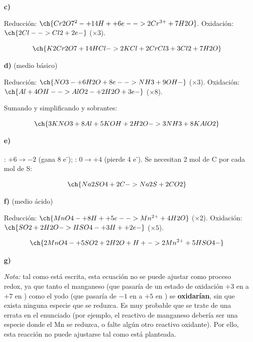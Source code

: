 \begin{exercise}
\begin{solu}
        \textbf{c) }

        Reducción: \(\ch{Cr2O7^2- + 14 H+ + 6 e- -> 2 Cr^{3+} + 7 H2O}\). Oxidación: \(\ch{2 Cl- -> Cl2 + 2 e-}\) (\(\times 3\)).

        \begin{equation*}
            \ch{K2Cr2O7 + 14 HCl -> 2 KCl + 2 CrCl3 + 3 Cl2 + 7 H2O}
        \end{equation*}

        \textbf{d) } (medio básico)

        Reducción: \(\ch{NO3- + 6 H2O + 8 e- -> NH3 + 9 OH-}\) (\(\times 3\)). Oxidación: \(\ch{Al + 4 OH- -> AlO2- + 2 H2O + 3 e-}\) (\(\times 8\)).

        Sumando y simplificando  y  sobrantes:

        \begin{equation*}
            \ch{3 KNO3 + 8 Al + 5 KOH + 2 H2O -> 3 NH3 + 8 KAlO2}
        \end{equation*}

        \textbf{e) }

        : \(+6 \to -2\) (gana 8 e\textsuperscript{-}); : \(0 \to +4\) (pierde 4 e\textsuperscript{-}). Se necesitan 2 mol de C por cada mol de S:

        \begin{equation*}
            \ch{Na2SO4 + 2 C -> Na2S + 2 CO2}
        \end{equation*}

        \textbf{f) } (medio ácido)

        Reducción: \(\ch{MnO4- + 8 H+ + 5 e- -> Mn^{2+} + 4 H2O}\) (\(\times 2\)). Oxidación: \(\ch{SO2 + 2 H2O -> HSO4- + 3 H+ + 2 e-}\) (\(\times 5\)).

        \begin{equation*}
            \ch{2 MnO4- + 5 SO2 + 2 H2O + H+ -> 2 Mn^{2+} + 5 HSO4-}
        \end{equation*}

        \textbf{g) }

        \textit{Nota:} tal como está escrita, esta ecuación no se puede ajustar como proceso redox, ya que tanto el manganeso (que pasaría de un estado de oxidación \(+3\) en  a \(+7\) en ) como el yodo (que pasaría de \(-1\) en  a \(+5\) en ) se \textbf{oxidarían}, sin que exista ninguna especie que se reduzca. Es muy probable que se trate de una errata en el enunciado (por ejemplo, el reactivo de manganeso debería ser una especie donde el Mn se reduzca, o falte algún otro reactivo oxidante). Por ello, esta reacción no puede ajustarse tal como está planteada.


\end{solu}
\end{exercise}
